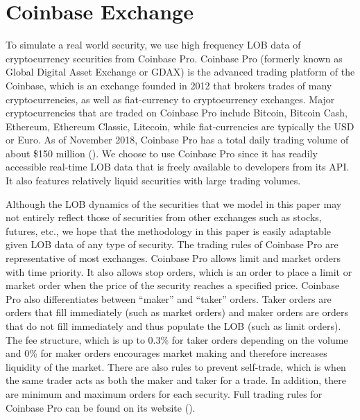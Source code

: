 \section{Coinbase Exchange}

To simulate a real world security, we use high frequency LOB data of cryptocurrency securities from Coinbase Pro. Coinbase Pro (formerly known as Global Digital Asset Exchange or GDAX) is the advanced trading platform of the Coinbase, which is an exchange founded in 2012 that brokers trades of many cryptocurrencies, as well as fiat-currency to cryptocurrency exchanges. Major cryptocurrencies that are traded on Coinbase Pro include Bitcoin, Bitcoin Cash, Ethereum, Ethereum Classic, Litecoin, while fiat-currencies are typically the USD or Euro. As of November 2018, Coinbase Pro has a total daily trading volume of about \$150 million (\cite{L1}). We choose to use Coinbase Pro since it has readily accessible real-time LOB data that is freely available to developers from its API. It also features relatively liquid securities with large trading volumes. 

Although the LOB dynamics of the securities that we model in this paper may not entirely reflect those of securities from other exchanges such as stocks, futures, etc., we hope that the methodology in this paper is easily adaptable given LOB data of any type of security. The trading rules of Coinbase Pro are representative of most exchanges. Coinbase Pro allows limit and market orders with time priority. It also allows stop orders, which is an order to place a limit or market order when the price of the security reaches a specified price. Coinbase Pro also differentiates between “maker” and “taker” orders. Taker orders are orders that fill immediately (such as market orders) and maker orders are orders that do not fill immediately and thus populate the LOB (such as limit orders). The fee structure, which is up to 0.3\% for taker orders depending on the volume and 0\% for maker orders encourages market making and therefore increases liquidity of the market. There are also rules to prevent self-trade, which is when the same trader acts as both the maker and taker for a trade. In addition, there are minimum and maximum orders for each security. Full trading rules for Coinbase Pro can be found on its website (\cite{L2}).

